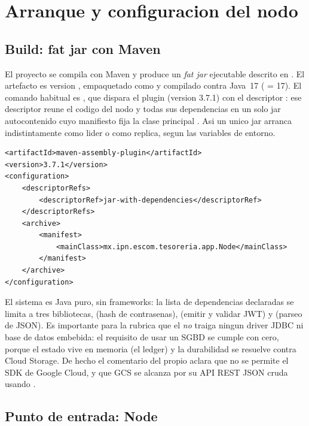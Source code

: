 \section{Arranque y configuracion del nodo}

\subsection{Build: fat jar con Maven}

El proyecto se compila con Maven y produce un \emph{fat jar} ejecutable
descrito en . El artefacto es 
version , empaquetado como  y compilado contra Java~17
( = 17). El comando habitual es
, que dispara el plugin
 (version 3.7.1) con el descriptor
: ese descriptor reune el codigo del nodo y todas
sus dependencias en un solo jar autocontenido cuyo manifiesto fija la clase
principal . Asi un unico jar arranca
indistintamente como lider o como replica, segun las variables de entorno.

\begin{lstlisting}[language=none,caption={Plugin assembly: fat jar y clase principal (pom.xml)}]
<artifactId>maven-assembly-plugin</artifactId>
<version>3.7.1</version>
<configuration>
    <descriptorRefs>
        <descriptorRef>jar-with-dependencies</descriptorRef>
    </descriptorRefs>
    <archive>
        <manifest>
            <mainClass>mx.ipn.escom.tesoreria.app.Node</mainClass>
        </manifest>
    </archive>
</configuration>
\end{lstlisting}

El sistema es Java puro, sin frameworks: la lista de dependencias declaradas se
limita a tres bibliotecas,  (hash de
contrasenas),  (emitir y validar JWT) y
 (parseo de JSON). Es importante para
la rubrica que el  \emph{no} traiga ningun driver JDBC ni base
de datos embebida: el requisito de usar un SGBD se cumple con cero, porque el
estado vive en memoria (el ledger) y la durabilidad se resuelve contra Cloud
Storage. De hecho el comentario del propio  aclara que no se
permite el SDK de Google Cloud, y que GCS se alcanza por su API REST JSON cruda
usando .

\subsection{Punto de entrada: Node}

